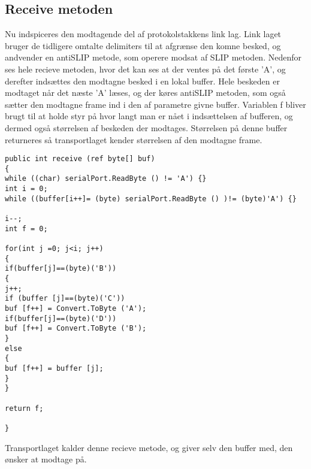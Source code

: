 \subsection{Receive metoden}
Nu indspiceres den modtagende del af protokolstakkens link lag. Link laget bruger de tidligere omtalte delimiters til at afgrænse den komne besked, og andvender en antiSLIP metode, som operere modsat af SLIP metoden. Nedenfor ses hele recieve metoden, hvor det kan ses at der ventes på det første 'A', og derefter indsættes den modtagne besked i en lokal buffer. Hele beskeden er modtaget når det næste 'A' læses, og der køres antiSLIP metoden, som også sætter den modtagne frame ind i den af parametre givne buffer.  Variablen f bliver brugt til at holde styr på hvor langt man er nået i indsættelsen af bufferen, og dermed også størrelsen af beskeden der modtages. Størrelsen på denne buffer returneres så transportlaget kender størrelsen af den modtagne frame.

\begin{verbatim}
public int receive (ref byte[] buf)
{
while ((char) serialPort.ReadByte () != 'A') {}
int i = 0;
while ((buffer[i++]= (byte) serialPort.ReadByte () )!= (byte)'A') {}

i--;
int f = 0;

for(int j =0; j<i; j++)
{
if(buffer[j]==(byte)('B'))
{
j++;
if (buffer [j]==(byte)('C'))
buf [f++] = Convert.ToByte ('A');
if(buffer[j]==(byte)('D'))
buf [f++] = Convert.ToByte ('B');
}
else
{
buf [f++] = buffer [j];
}
}

return f;

}
\end{verbatim}

Transportlaget kalder denne recieve metode, og giver selv den buffer med, den ønsker at modtage på.